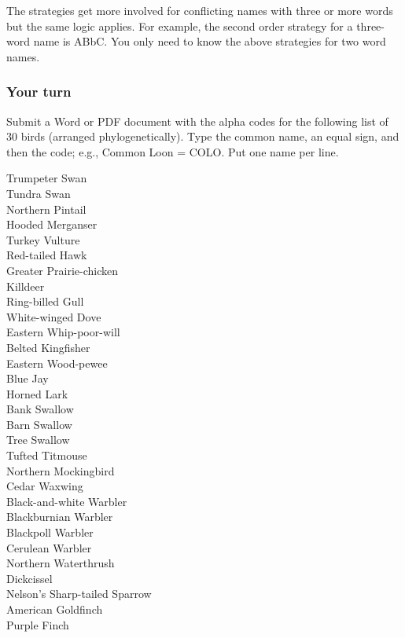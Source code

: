 \documentclass[11pt]{article}
\begin{document}
The strategies get more involved for conflicting names with three or more words but the same logic applies. For example, the second order strategy for a three-word name is ABbC. You only need to know the above strategies for two word names.

\subsubsection*{Your turn}

Submit a Word or PDF document with the alpha codes for the following list of 30 birds (arranged phylogenetically). Type the common name, an equal sign, and then the code; e.g., Common Loon = COLO.  Put one name per line.

\begin{multicols}{2}
Trumpeter Swan\\
Tundra Swan\\
Northern Pintail\\
Hooded Merganser\\
Turkey Vulture\\
Red-tailed Hawk\\
Greater Prairie-chicken\\
Killdeer\\
Ring-billed Gull\\
White-winged Dove\\
Eastern Whip-poor-will\\
Belted Kingfisher\\
Eastern Wood-pewee\\
Blue Jay\\
Horned Lark\\
Bank Swallow\\
Barn Swallow\\
Tree Swallow\\
Tufted Titmouse\\
Northern Mockingbird\\
Cedar Waxwing\\
Black-and-white Warbler\\
Blackburnian Warbler\\
Blackpoll Warbler\\
Cerulean Warbler\\
Northern Waterthrush\\
Dickcissel\\
Nelson's Sharp-tailed Sparrow\\
American Goldfinch\\
Purple Finch
\end{multicols}
\end{document}
